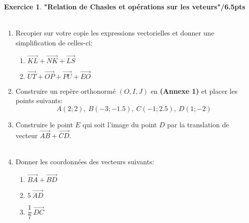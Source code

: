 \documentclass[a4paper,10.9pt]{article}
\theoremstyle{definition}
\newtheorem{exo}{Exercice}
\newcommand{\V}{\overrightarrow}
\begin{document}
\begin{exo} \textbf{"Relation de Chasles et opérations sur les veteurs"}\hfill\textbf{/6.5pts}\\\hfil\\
\begin{enumerate}
\item Recopier sur votre copie les expressions vectorielles et donner une simplification de celles-ci:
\begin{multicols}{2}
\begin{enumerate}[$\diamond$]

		\item $\V{KL}+\V{NK} + \V{LS}$\\
		\item $\V{UT}+\V{OP}+\V{PU}+\V{EO}$ \\

\end{enumerate}
\end{multicols}
 
\item Construire un repère orthonormé $(O,I,J)$ en \textbf{(Annexe 1)} et placer les points suivants:
$$A(2;2), \ B(-3;-1.5), \   C(-1;2.5), \  D(1;-2) $$
\item Construire le point $E$ qui soit l'image du point $D$ par la translation de vecteur $\V{AB}+\V{CD}$.\\\hfill\\
\item Donner les coordonnées des vecteurs suivants:
\begin{multicols}{3}
\begin{enumerate}[$\diamond$]

		\item $ \V{BA}+\V{BD}$\\
		\item $5 ~\V{AD}$ \\
		\item $\dfrac{1}{7}~ \V{DC}$ \\

\end{enumerate} \end{multicols}


\end{enumerate}
\end{exo}

\newpage
{}\chead{}\renewcommand{\headrulewidth}{0.4pt}\renewcommand{\footrulewidth}{0.4pt}
\end{document}
